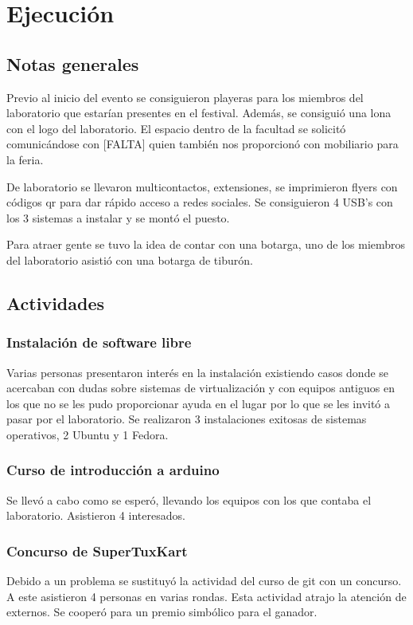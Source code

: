 \documentclass[a4paper,11pt]{article}                 %
\begin{document}
  \section{Ejecución}
  \subsection{Notas generales}
    Previo al inicio del evento se consiguieron playeras para los miembros del laboratorio que estarían presentes en el festival. Además, se consiguió una lona con el logo del laboratorio. El espacio dentro de la facultad se solicitó comunicándose con [FALTA] quien también nos proporcionó con mobiliario para la feria.

    De laboratorio se llevaron multicontactos, extensiones, se imprimieron flyers con códigos qr para dar rápido acceso a redes sociales. Se consiguieron 4 USB's con los 3 sistemas a instalar y se montó el puesto.

    Para atraer gente se tuvo la idea de contar con una botarga, uno de los miembros del laboratorio asistió con una botarga de tiburón.
  \subsection{Actividades}
    \subsubsection{Instalación de software libre}
      Varias personas presentaron interés en la instalación existiendo casos donde se acercaban con dudas sobre sistemas de virtualización y con equipos antiguos en los que no se les pudo proporcionar ayuda en el lugar por lo que se les invitó a pasar por el laboratorio. Se realizaron 3 instalaciones exitosas de sistemas operativos, 2 Ubuntu y 1 Fedora.
    \subsubsection{Curso de introducción a arduino}
      Se llevó a cabo como se esperó, llevando los equipos con los que contaba el laboratorio. Asistieron 4 interesados.
    \subsubsection{Concurso de SuperTuxKart}
      Debido a un problema se sustituyó la actividad del curso de git con un concurso. A este asistieron 4 personas en varias rondas. Esta actividad atrajo la atención de externos. Se cooperó para un premio simbólico para el ganador.
\end{document}
